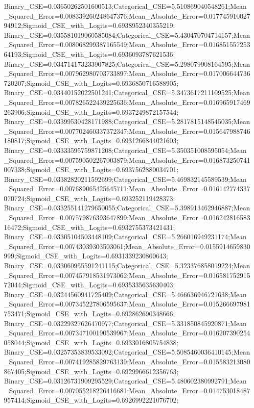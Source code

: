 Binary_CSE=0.03650262501600513;Categorical_CSE=5.510869040548261;Mean_Squared_Error=0.008339260248647376;Mean_Absolute_Error=0.01774591002794912;Sigmoid_CSE_with_Logits=0.6938952340355219;
Binary_CSE=0.035581019060585084;Categorical_CSE=5.430470704714157;Mean_Squared_Error=0.008068299387165549;Mean_Absolute_Error=0.01685155725364193;Sigmoid_CSE_with_Logits=0.6936093787621536;
Binary_CSE=0.034714173233907825;Categorical_CSE=5.298079908164595;Mean_Squared_Error=0.007962980703733897;Mean_Absolute_Error=0.017006644736720207;Sigmoid_CSE_with_Logits=0.6936850716588905;
Binary_CSE=0.03440152022501241;Categorical_CSE=5.3473617211109525;Mean_Squared_Error=0.007826522439225636;Mean_Absolute_Error=0.016965917469263906;Sigmoid_CSE_with_Logits=0.6937249872157544;
Binary_CSE=0.03399530428171988;Categorical_CSE=5.2817815148545035;Mean_Squared_Error=0.007702460337372347;Mean_Absolute_Error=0.015647988746180817;Sigmoid_CSE_with_Logits=0.6931266844021603;
Binary_CSE=0.03333595759871208;Categorical_CSE=5.350351008595054;Mean_Squared_Error=0.007590502267003879;Mean_Absolute_Error=0.016873250741007338;Sigmoid_CSE_with_Logits=0.6937562880034701;
Binary_CSE=0.03382820211592699;Categorical_CSE=5.469832145589539;Mean_Squared_Error=0.007689065425645711;Mean_Absolute_Error=0.016142774337070724;Sigmoid_CSE_with_Logits=0.693252119428373;
Binary_CSE=0.033255141279650055;Categorical_CSE=5.398913462946887;Mean_Squared_Error=0.007579876393647899;Mean_Absolute_Error=0.01624281658316472;Sigmoid_CSE_with_Logits=0.6932755373421431;
Binary_CSE=0.03305104503448109;Categorical_CSE=5.266016949231174;Mean_Squared_Error=0.00743039303503061;Mean_Absolute_Error=0.0155914659830999;Sigmoid_CSE_with_Logits=0.6931339230860643;
Binary_CSE=0.033060955591241115;Categorical_CSE=5.323376858019224;Mean_Squared_Error=0.007457918531973062;Mean_Absolute_Error=0.01658175291572044;Sigmoid_CSE_with_Logits=0.6935335635630403;
Binary_CSE=0.03244560941725409;Categorical_CSE=5.466636946721638;Mean_Squared_Error=0.007345227806595637;Mean_Absolute_Error=0.015266697981753471;Sigmoid_CSE_with_Logits=0.692862690348666;
Binary_CSE=0.03229327626470977;Categorical_CSE=5.331850845920871;Mean_Squared_Error=0.007347100190539967;Mean_Absolute_Error=0.016207390254058044;Sigmoid_CSE_with_Logits=0.6933016805754838;
Binary_CSE=0.03257353839533092;Categorical_CSE=5.5085460036410145;Mean_Squared_Error=0.007419285829763139;Mean_Absolute_Error=0.015583213080867405;Sigmoid_CSE_with_Logits=0.6929966612356763;
Binary_CSE=0.03126731909295529;Categorical_CSE=5.480602380992791;Mean_Squared_Error=0.007055218226416681;Mean_Absolute_Error=0.014753018487957414;Sigmoid_CSE_with_Logits=0.6926992221076702;
